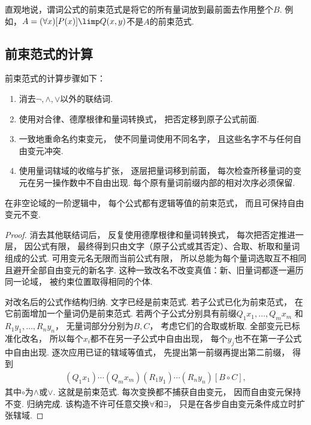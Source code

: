 直观地说，谓词公式的前束范式是将它的所有量词放到最前面去作用整个\(B\).
例如，\(A = (\forall x)[P(x)] \limp Q(x,y)\)不是\(A\)的前束范式.

\subsection{前束范式的计算}
前束范式的计算步骤如下：
\begin{enumerate}
    \item 消去\(\neg,\land,\lor\)以外的联结词.
    \item 使用对合律、德摩根律和量词转换式，
    把否定移到原子公式前面.
    \item 一致地重命名约束变元，
    使不同量词使用不同名字，
    且这些名字不与任何自由变元冲突.
    \item 使用量词辖域的收缩与扩张，
    逐层把量词移到前面，
    每次检查所移量词的变元在另一操作数中不自由出现.
    每个原有量词前缀内部的相对次序必须保留.
\end{enumerate}

\begin{theorem}[前束范式的存在性]
    在非空论域的一阶逻辑中，
    每个公式都有逻辑等值的前束范式，
    而且可保持自由变元不变.
    \begin{proof}
        消去其他联结词后，
        反复使用德摩根律和量词转换式，
        每次把否定推进一层，
        因公式有限，
        最终得到只由文字（原子公式或其否定）、合取、析取和量词组成的公式.
        可用变元名无限而当前公式有限，
        所以总能为每个量词选取互不相同且避开全部自由变元的新名字.
        这种一致改名不改变真值：新、旧量词都逐一遍历同一论域，
        被约束位置取得相同的个体.

        对改名后的公式作结构归纳.
        文字已经是前束范式.
        若子公式已化为前束范式，
        在它前面增加一个量词仍是前束范式.
        若两个子公式分别具有前缀\(Q_1x_1,\dotsc,Q_mx_m\)
        和\(R_1y_1,\dotsc,R_ny_n\)，
        无量词部分分别为\(B,C\)，
        考虑它们的合取或析取.
        全部变元已标准化改名，
        所以每个\(x_i\)都不在另一子公式中自由出现，
        每个\(y_j\)也不在第一子公式中自由出现.
        逐次应用已证的辖域等值式，
        先提出第一前缀再提出第二前缀，
        得到
        \begin{align*}
            (Q_1x_1)\dotsm(Q_mx_m)(R_1y_1)\dotsm(R_ny_n)[B\circ C],
        \end{align*}
        其中\(\circ\)为\(\land\)或\(\lor\).
        这就是前束范式.
        每次变换都不捕获自由变元，
        因而自由变元保持不变.
        归纳完成.
        该构造不许可任意交换\(\forall\)和\(\exists\)，
        只是在各步自由变元条件成立时扩张辖域.
    \end{proof}
\end{theorem}

